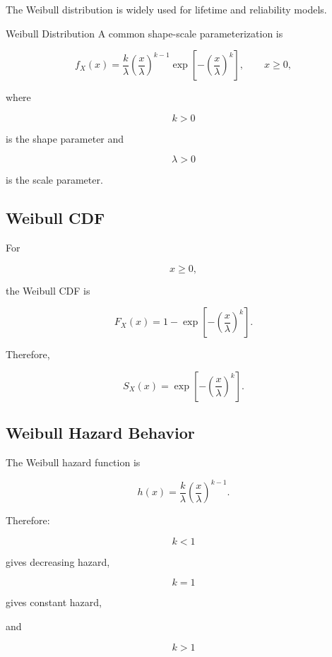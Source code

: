 The Weibull distribution is widely used for lifetime and reliability
models.

\begin{definitionbox}{Weibull Distribution}
A common shape-scale parameterization is

\[
\boxed{
f_X(x)
=
\frac{k}{\lambda}
\left(
\frac{x}{\lambda}
\right)^{k-1}
\exp
\left[
-
\left(
\frac{x}{\lambda}
\right)^k
\right],
\qquad
x\geq0,
}
\]

where

\[
k>0
\]

is the shape parameter and

\[
\lambda>0
\]

is the scale parameter.
\end{definitionbox}

\subsection{Weibull CDF}
\label{subsec:weibull-cdf}

For

\[
x\geq0,
\]

the Weibull CDF is

\[
\boxed{
F_X(x)
=
1-
\exp
\left[
-
\left(
\frac{x}{\lambda}
\right)^k
\right].
}
\]

Therefore,

\[
\boxed{
S_X(x)
=
\exp
\left[
-
\left(
\frac{x}{\lambda}
\right)^k
\right].
}
\]

\subsection{Weibull Hazard Behavior}
\label{subsec:weibull-hazard}

The Weibull hazard function is

\[
\boxed{
h(x)
=
\frac{k}{\lambda}
\left(
\frac{x}{\lambda}
\right)^{k-1}.
}
\]

Therefore:

\[
k<1
\]

gives decreasing hazard,

\[
k=1
\]

gives constant hazard,

and

\[
k>1
\]

